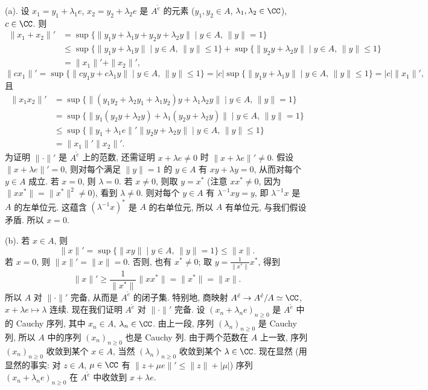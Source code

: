 \begin{solution}
(a). 设 $x_1 = y_1 + \lambda_1e$, $x_2 = y_2 + \lambda_2e$ 是 $A^{\tilde{e}}$ 的元素 ($y_1, y_2 \in A$, $\lambda_1, \lambda_2 \in \CC$), $c \in \CC$. 则
\begin{align*}
\|x_1 + x_2\|' &= \sup\{\|y_1y + \lambda_1y + y_2y + \lambda_2y\| \mid y \in A,\, \|y\| = 1\} \\
&\leq \sup\{\|y_1y + \lambda_1y\| \mid y \in A,\, \|y\| \leq 1\} + \sup\{\|y_2y + \lambda_2y\| \mid y \in A,\, \|y\| \leq 1\} \\
&= \|x_1\|' + \|x_2\|',
\end{align*}
\[
\|cx_1\|' = \sup\{\|cy_1y + c\lambda_1y\| \mid y \in A,\, \|y\| \leq 1\} = |c|\sup\{\|y_1y + \lambda_1y\| \mid y \in A,\, \|y\| \leq 1\} = |c|\|x_1\|',
\]
且
\begin{align*}
\|x_1x_2\|' &= \sup\{\|(y_1y_2 + \lambda_2y_1 + \lambda_1y_2)y + \lambda_1\lambda_2y\| \mid y \in A,\, \|y\| = 1\} \\
&= \sup\{\|y_1(y_2y + \lambda_2y) + \lambda_1(y_2y + \lambda_2y)\| \mid y \in A,\, \|y\| = 1\} \\
&\leq \sup\{\|y_1 + \lambda_1e\|'\|y_2y + \lambda_2y\| \mid y \in A,\, \|y\| \leq 1\} \\
&= \|x_1\|'\|x_2\|'.
\end{align*}
为证明 $\|\cdot\|'$ 是 $A^{\tilde{e}}$ 上的范数, 还需证明 $x + \lambda e \neq 0$ 时 $\|x + \lambda e\|' \neq 0$. 假设 $\|x + \lambda e\|' = 0$, 则对每个满足 $\|y\| = 1$ 的 $y \in A$ 有 $xy + \lambda y = 0$, 从而对每个 $y \in A$ 成立. 若 $x = 0$, 则 $\lambda = 0$. 若 $x \neq 0$, 则取 $y = x^*$ (注意 $xx^* \neq 0$, 因为 $\|xx^*\| = \|x^*\|^2 \neq 0$), 看到 $\lambda \neq 0$. 则对每个 $y \in A$ 有 $\lambda^{-1}xy = y$, 即 $\lambda^{-1}x$ 是 $A$ 的左单位元. 这蕴含 $(\lambda^{-1}x)^*$ 是 $A$ 的右单位元, 所以 $A$ 有单位元, 与我们假设矛盾. 所以 $x = 0$.

(b). 若 $x \in A$, 则
\[
\|x\|' = \sup\{\|xy\| \mid y \in A,\, \|y\| = 1\} \leq \|x\|.
\]
若 $x = 0$, 则 $\|x\|' = \|x\| = 0$. 否则, 也有 $x^* \neq 0$; 取 $y = \frac{1}{\|x^*\|}x^*$, 得到
\[
\|x\|' \geq \frac{1}{\|x^*\|}\|xx^*\| = \|x^*\| = \|x\|.
\]
所以 $A$ 对 $\|\cdot\|'$ 完备, 从而是 $A^{\tilde{e}}$ 的闭子集. 特别地, 商映射 $A^{\tilde{e}} \to A^{\tilde{e}}/A \simeq \CC$, $x + \lambda e \longmapsto \lambda$ 连续.
现在我们证明 $A^{\tilde{e}}$ 对 $\|\cdot\|'$ 完备. 设 $(x_n + \lambda_ne)_{n \geq 0}$ 是 $A^{\tilde{e}}$ 中的 Cauchy 序列, 其中 $x_n \in A$, $\lambda_n \in \CC$. 由上一段, 序列 $(\lambda_n)_{n \geq 0}$ 是 Cauchy 列, 所以 $A$ 中的序列 $(x_n)_{n \geq 0}$ 也是 Cauchy 列. 由于两个范数在 $A$ 上一致, 序列 $(x_n)_{n \geq 0}$ 收敛到某个 $x \in A$, 当然 $(\lambda_n)_{n \geq 0}$ 收敛到某个 $\lambda \in \CC$. 现在显然 (用显然的事实: 对 $z \in A$, $\mu \in \CC$ 有 $\|z + \mu e\|' \leq \|z\| + |\mu|$) 序列 $(x_n + \lambda_ne)_{n \geq 0}$ 在 $A^{\tilde{e}}$ 中收敛到 $x + \lambda e$.


\end{solution}
